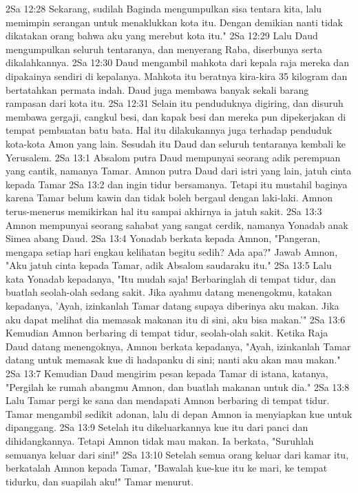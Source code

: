 2Sa 12:28  Sekarang, sudilah Baginda mengumpulkan sisa tentara kita, lalu memimpin serangan untuk menaklukkan kota itu. Dengan demikian nanti tidak dikatakan orang bahwa aku yang merebut kota itu."
2Sa 12:29  Lalu Daud mengumpulkan seluruh tentaranya, dan menyerang Raba, diserbunya serta dikalahkannya.
2Sa 12:30  Daud mengambil mahkota dari kepala raja mereka dan dipakainya sendiri di kepalanya. Mahkota itu beratnya kira-kira 35 kilogram dan bertatahkan permata indah. Daud juga membawa banyak sekali barang rampasan dari kota itu.
2Sa 12:31  Selain itu penduduknya digiring, dan disuruh membawa gergaji, cangkul besi, dan kapak besi dan mereka pun dipekerjakan di tempat pembuatan batu bata. Hal itu dilakukannya juga terhadap penduduk kota-kota Amon yang lain. Sesudah itu Daud dan seluruh tentaranya kembali ke Yerusalem.
2Sa 13:1  Absalom putra Daud mempunyai seorang adik perempuan yang cantik, namanya Tamar. Amnon putra Daud dari istri yang lain, jatuh cinta kepada Tamar
2Sa 13:2  dan ingin tidur bersamanya. Tetapi itu mustahil baginya karena Tamar belum kawin dan tidak boleh bergaul dengan laki-laki. Amnon terus-menerus memikirkan hal itu sampai akhirnya ia jatuh sakit.
2Sa 13:3  Amnon mempunyai seorang sahabat yang sangat cerdik, namanya Yonadab anak Simea abang Daud.
2Sa 13:4  Yonadab berkata kepada Amnon, "Pangeran, mengapa setiap hari engkau kelihatan begitu sedih? Ada apa?" Jawab Amnon, "Aku jatuh cinta kepada Tamar, adik Absalom saudaraku itu."
2Sa 13:5  Lalu kata Yonadab kepadanya, "Itu mudah saja! Berbaringlah di tempat tidur, dan buatlah seolah-olah sedang sakit. Jika ayahmu datang menengokmu, katakan kepadanya, 'Ayah, izinkanlah Tamar datang supaya diberinya aku makan. Jika aku dapat melihat dia memasak makanan itu di sini, aku bisa makan.'"
2Sa 13:6  Kemudian Amnon berbaring di tempat tidur, seolah-olah sakit. Ketika Raja Daud datang menengoknya, Amnon berkata kepadanya, "Ayah, izinkanlah Tamar datang untuk memasak kue di hadapanku di sini; nanti aku akan mau makan."
2Sa 13:7  Kemudian Daud mengirim pesan kepada Tamar di istana, katanya, "Pergilah ke rumah abangmu Amnon, dan buatlah makanan untuk dia."
2Sa 13:8  Lalu Tamar pergi ke sana dan mendapati Amnon berbaring di tempat tidur. Tamar mengambil sedikit adonan, lalu di depan Amnon ia menyiapkan kue untuk dipanggang.
2Sa 13:9  Setelah itu dikeluarkannya kue itu dari panci dan dihidangkannya. Tetapi Amnon tidak mau makan. Ia berkata, "Suruhlah semuanya keluar dari sini!"
2Sa 13:10  Setelah semua orang keluar dari kamar itu, berkatalah Amnon kepada Tamar, "Bawalah kue-kue itu ke mari, ke tempat tidurku, dan suapilah aku!" Tamar menurut.
